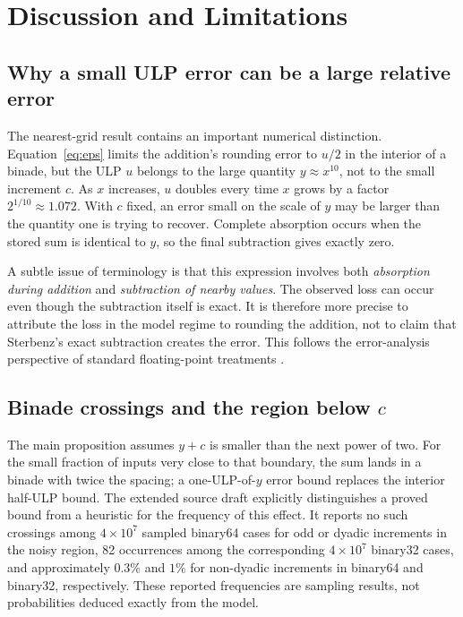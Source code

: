 \chapter{Discussion and Limitations}\label{ch:discussion}

\section{Why a small ULP error can be a large relative error}
The nearest-grid result contains an important numerical distinction. Equation~\eqref{eq:eps} limits the addition's rounding error to $u/2$ in the interior of a binade, but the ULP $u$ belongs to the large quantity $y\approx x^{10}$, not to the small increment $c$. As $x$ increases, $u$ doubles every time $x$ grows by a factor $2^{1/10}\approx1.072$. With $c$ fixed, an error small on the scale of $y$ may be larger than the quantity one is trying to recover. Complete absorption occurs when the stored sum is identical to $y$, so the final subtraction gives exactly zero.

A subtle issue of terminology is that this expression involves both \emph{absorption during addition} and \emph{subtraction of nearby values}. The observed loss can occur even though the subtraction itself is exact. It is therefore more precise to attribute the loss in the model regime to rounding the addition, not to claim that Sterbenz's exact subtraction creates the error. This follows the error-analysis perspective of standard floating-point treatments \cite{goldberg1991floating,higham2002accuracy}.

\section{Binade crossings and the region below \texorpdfstring{$c$}{c}}
The main proposition assumes $y+c$ is smaller than the next power of two. For the small fraction of inputs very close to that boundary, the sum lands in a binade with twice the spacing; a one-ULP-of-$y$ error bound replaces the interior half-ULP bound. The extended source draft explicitly distinguishes a proved bound from a heuristic for the frequency of this effect. It reports no such crossings among $4\times10^7$ sampled binary64 cases for odd or dyadic increments in the noisy region, 82 occurrences among the corresponding $4\times10^7$ binary32 cases, and approximately $0.3\%$ and $1\%$ for non-dyadic increments in binary64 and binary32, respectively. These reported frequencies are sampling results, not probabilities deduced exactly from the model.

